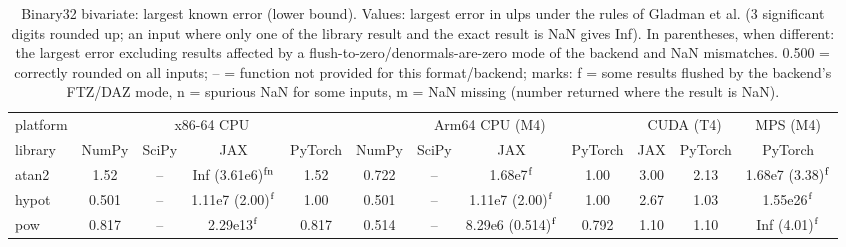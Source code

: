 \begin{table}
\centering
\begin{small}
\begin{tabular}{|l|cccc|cccc|cc|c|}
\hline
platform & \multicolumn{4}{c|}{x86-64 CPU} & \multicolumn{4}{c|}{Arm64 CPU (M4)} & \multicolumn{2}{c|}{CUDA (T4)} & \multicolumn{1}{c|}{MPS (M4)} \\
library & NumPy & SciPy & JAX & PyTorch & NumPy & SciPy & JAX & PyTorch & JAX & PyTorch & PyTorch \\ \hline
atan2 & 1.52 & -- & Inf (3.61e6)$^{\rm fn}$ & 1.52 & 0.722 & -- & 1.68e7$^{\rm f}$ & 1.00 & 3.00 & 2.13 & 1.68e7 (3.38)$^{\rm f}$ \\
hypot & 0.501 & -- & 1.11e7 (2.00)$^{\rm f}$ & 1.00 & 0.501 & -- & 1.11e7 (2.00)$^{\rm f}$ & 1.00 & 2.67 & 1.03 & 1.55e26$^{\rm f}$ \\
pow & 0.817 & -- & 2.29e13$^{\rm f}$ & 0.817 & 0.514 & -- & 8.29e6 (0.514)$^{\rm f}$ & 0.792 & 1.10 & 1.10 & Inf (4.01)$^{\rm f}$ \\
\hline
\end{tabular}
\end{small}
\caption{Binary32 bivariate: largest known error (lower bound). Values: largest error in ulps under the rules of Gladman et al. (3 significant digits rounded up; an input where only one of the library result and the exact result is NaN gives Inf). In parentheses, when different: the largest error excluding results affected by a flush-to-zero/denormals-are-zero mode of the backend and NaN mismatches. 0.500 = correctly rounded on all inputs; -- = function not provided for this format/backend; marks: f = some results flushed by the backend's FTZ/DAZ mode, n = spurious NaN for some inputs, m = NaN missing (number returned where the result is NaN). }
\label{tab:b32bi}
\end{table}
